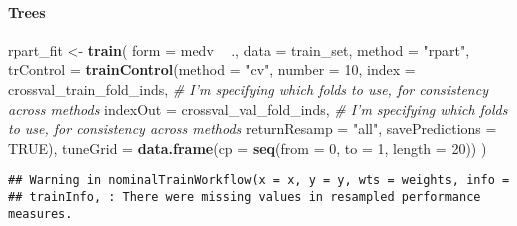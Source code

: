 \documentclass[]{article}
\newenvironment{Shaded}{\begin{snugshade}}{\end{snugshade}}
\newcommand{\CommentTok}[1]{\textcolor[rgb]{0.56,0.35,0.01}{\textit{#1}}}
\newcommand{\DataTypeTok}[1]{\textcolor[rgb]{0.13,0.29,0.53}{#1}}
\newcommand{\DecValTok}[1]{\textcolor[rgb]{0.00,0.00,0.81}{#1}}
\newcommand{\KeywordTok}[1]{\textcolor[rgb]{0.13,0.29,0.53}{\textbf{#1}}}
\newcommand{\NormalTok}[1]{#1}
\newcommand{\OperatorTok}[1]{\textcolor[rgb]{0.81,0.36,0.00}{\textbf{#1}}}
\newcommand{\OtherTok}[1]{\textcolor[rgb]{0.56,0.35,0.01}{#1}}
\newcommand{\StringTok}[1]{\textcolor[rgb]{0.31,0.60,0.02}{#1}}
\let\oldparagraph\paragraph
\renewcommand{\paragraph}[1]{\oldparagraph{#1}\mbox{}}
\begin{document}
\newpage

\hypertarget{trees}{%
\paragraph{Trees}\label{trees}}

\begin{Shaded}
\begin{Highlighting}[]
\NormalTok{rpart_fit <-}\StringTok{ }\KeywordTok{train}\NormalTok{(}
  \DataTypeTok{form =}\NormalTok{ medv }\OperatorTok{~}\StringTok{ }\NormalTok{.,}
  \DataTypeTok{data =}\NormalTok{ train_set,}
  \DataTypeTok{method =} \StringTok{"rpart"}\NormalTok{,}
  \DataTypeTok{trControl =} \KeywordTok{trainControl}\NormalTok{(}\DataTypeTok{method =} \StringTok{"cv"}\NormalTok{,}
    \DataTypeTok{number =} \DecValTok{10}\NormalTok{,}
    \DataTypeTok{index =}\NormalTok{ crossval_train_fold_inds, }\CommentTok{# I'm specifying which folds to use, for consistency across methods}
    \DataTypeTok{indexOut =}\NormalTok{ crossval_val_fold_inds, }\CommentTok{# I'm specifying which folds to use, for consistency across methods}
    \DataTypeTok{returnResamp =} \StringTok{"all"}\NormalTok{,}
    \DataTypeTok{savePredictions =} \OtherTok{TRUE}\NormalTok{),}
  \DataTypeTok{tuneGrid =} \KeywordTok{data.frame}\NormalTok{(}\DataTypeTok{cp =} \KeywordTok{seq}\NormalTok{(}\DataTypeTok{from =} \DecValTok{0}\NormalTok{, }\DataTypeTok{to =} \DecValTok{1}\NormalTok{, }\DataTypeTok{length =} \DecValTok{20}\NormalTok{))}
\NormalTok{)}
\end{Highlighting}
\end{Shaded}

\begin{verbatim}
## Warning in nominalTrainWorkflow(x = x, y = y, wts = weights, info =
## trainInfo, : There were missing values in resampled performance measures.
\end{verbatim}

\begin{Shaded}
\end{Shaded}
\end{document}

